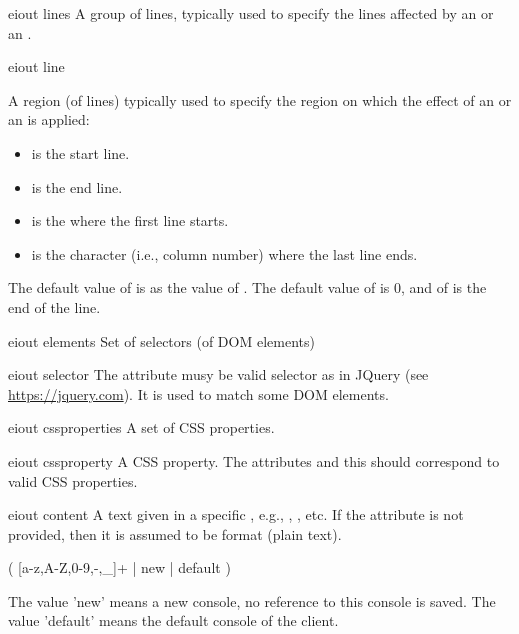 \bigskip
\xmlstruct
{eiout}
{lines}
{
A group of lines, typically used to specify the lines affected by 
an  or an .
}


\bigskip
\xmlstruct
{eiout}
{line}
{%
%
  A region (of lines) typically used to specify the region on which
  the effect of an  or an
   is applied:
%
\begin{itemize}
\item {} is the start line.
\item {} is the end line.
\item {} is the  where the first line starts.
\item {} is the character (i.e., column number) where the last line ends.
\end{itemize}
%
The default value of  is as the value of
. The default value of  is
0, and of  is the end of the line.
%
}

\bigskip
\xmlstruct
{eiout}
{elements}
{%
  Set of selectors (of DOM elements)
} 

\bigskip
\xmlstruct
{eiout}
{selector}
{%
%
  The attribute  musy be valid selector as in
  JQuery (see \url{https://jquery.com}). It is used to match some DOM
  elements.
%
}


\bigskip
\xmlstruct
{eiout}
{cssproperties}
{%
%
A set of CSS properties.
%
}


\bigskip
\xmlstruct
{eiout}
{cssproperty}
{%
%
  A CSS property. The attributes  and this
   should correspond to valid CSS properties.
%
}


\bigskip
\xmlstruct
{eiout}
{content}
{%
%
  A text given in a specific , e.g.,
  , , etc. If the
  attribute  is not provided, then it is assumed
  to be  format (plain text).
%
}

\bigskip
\noindent
{}

( [a-z,A-Z,0-9,-,\_]+ | new | default )

\medskip
\noindent
The value 'new' means a new console, no reference to this console is
saved. The value 'default' means the default console of the client.


